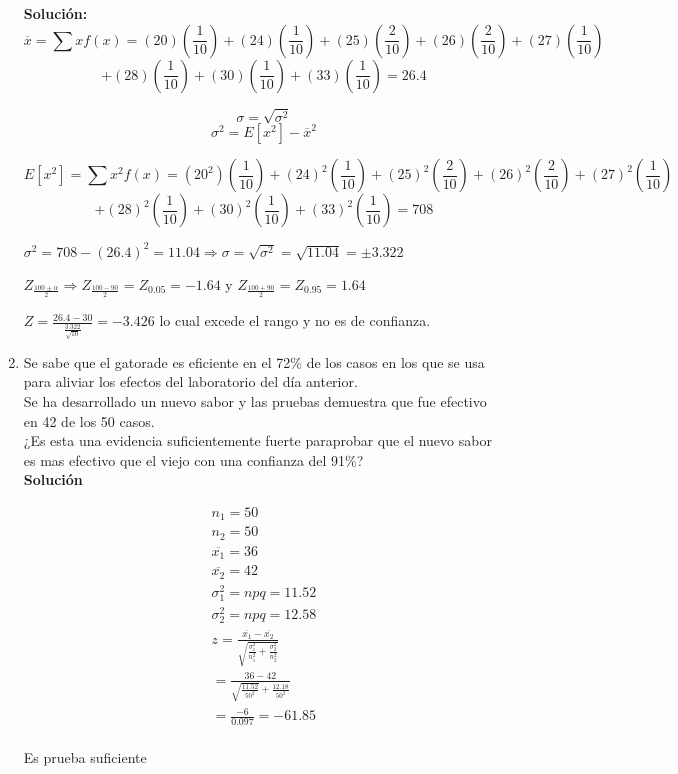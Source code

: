 \begin{enumerate}
    \textbf{Solución: } 
    $$ \overline{x} = \sum xf(x)= (20)\left( \frac{1}{10} \right) + (24)\left( \frac{1}{10} \right) + (25)\left( \frac{2}{10} \right) + (26)\left( \frac{2}{10} \right) + (27)\left( \frac{1}{10} \right) $$ $$ +  (28)\left( \frac{1}{10} \right) + (30)\left( \frac{1}{10} \right)+ (33)\left( \frac{1}{10} \right) = 26.4 $$
    
    
    $$ \sigma = \sqrt{\sigma^2} $$
    $$ \sigma^2 = E[x^2] - \overline{x}^2 $$
    
    $$ E[x^2] = \sum x^2f(x)= (20^2)\left( \frac{1}{10} \right) + (24)^2\left( \frac{1}{10} \right) + (25)^2\left( \frac{2}{10} \right) + (26)^2\left( \frac{2}{10} \right) + (27)^2\left( \frac{1}{10} \right) $$ $$ +  (28)^2\left( \frac{1}{10} \right) + (30)^2\left( \frac{1}{10} \right)+ (33)^2\left( \frac{1}{10} \right) = 708 $$
    
    $ \sigma^2 = 708 - (26.4)^2 = 11.04  \Rightarrow \sigma = \sqrt{\sigma^2} = \sqrt{11.04} = \pm 3.322$ \\
    
    \begin{center}
        $ Z_{\frac{100 \pm \alpha}{2}} \Rightarrow  Z_{\frac{100-90}{2}} = Z_{0.05} = -1.64 $ y $ Z_{\frac{100+90}{2}} = Z_{0.95} = 1.64   $ 
    \end{center}
    
     $ Z = \frac{26.4 - 30}{\frac{3.322}{\sqrt{10}}} = -3.426 $ lo cual excede el rango y no es de confianza.
    
    \item Se sabe que el gatorade es eficiente en el 72\% de los casos en los que se usa para aliviar los efectos del laboratorio del día anterior. \\
    Se ha desarrollado un nuevo sabor y las pruebas demuestra que fue efectivo en 42 de los 50 casos.\\
    ¿Es esta una evidencia suficientemente fuerte paraprobar que el nuevo sabor es mas efectivo que el viejo con una confianza del 91\%?
    \\\textbf{Solución}
    
    \begin{gather*}	 
    n_{1} = 50\\
    n_{2} = 50\\
    \overline{x_{1}} = 36\\
    \overline{x_{2}} = 42\\	
    \sigma_{1}^{2} = npq =11.52\\
    \sigma_{2}^{2} = npq =12.58\\
    z = \frac{\overline{x_{1}} - \overline{x_{2}}}{\sqrt{\frac{\sigma_{1}^{2}}{n_{1}^{2}} + \frac{\sigma_{2}^{2}}{n_{2}^{2}}}}\\= \frac{36-42}{\sqrt{\frac{11.52}{50^{2}}}+\frac{12.18}{50^{2}}}\\
    =\frac{-6}{0.097} = -61.85\\
    \end{gather*}
    \begin{center}
         Es prueba suficiente
    \end{center}


\end{enumerate}
